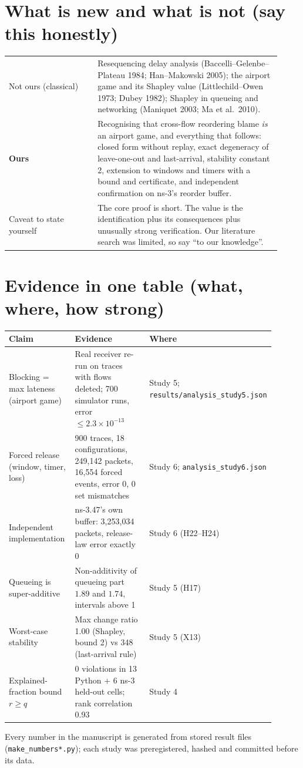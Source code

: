 \documentclass[11pt]{article}
\begin{document}
\section{What is new and what is not (say this honestly)}
\begin{center}
\begin{tabular}{p{0.30\linewidth}p{0.62\linewidth}}
\toprule
Not ours (classical) & Resequencing delay analysis (Baccelli--Gelenbe--Plateau 1984; Han--Makowski 2005); the airport game and its Shapley value (Littlechild--Owen 1973; Dubey 1982); Shapley in queueing and networking (Maniquet 2003; Ma et al.\ 2010).\\
\textbf{Ours} & Recognising that cross-flow reordering blame \emph{is} an airport game, and everything that follows: closed form without replay, exact degeneracy of leave-one-out and last-arrival, stability constant 2, extension to windows and timers with a bound and certificate, and independent confirmation on ns-3's reorder buffer.\\
Caveat to state yourself & The core proof is short. The value is the identification plus its consequences plus unusually strong verification. Our literature search was limited, so say ``to our knowledge''.\\
\bottomrule
\end{tabular}
\end{center}

\section{Evidence in one table (what, where, how strong)}
\begin{center}\small
\begin{tabular}{p{0.26\linewidth}p{0.36\linewidth}p{0.28\linewidth}}
\toprule
Claim & Evidence & Where\\
\midrule
Blocking = max lateness (airport game) & Real receiver re-run on traces with flows deleted; 700 simulator runs, error $\le 2.3\times10^{-13}$ & Study 5; \texttt{results/analysis\_study5.json}\\
Forced release (window, timer, loss) & 900 traces, 18 configurations, 249{,}142 packets, 16{,}554 forced events, error 0, 0 set mismatches & Study 6; \texttt{analysis\_study6.json}\\
Independent implementation & ns-3.47's own buffer: 3{,}253{,}034 packets, release-law error exactly 0 & Study 6 (H22--H24)\\
Queueing is super-additive & Non-additivity of queueing part $1.89$ and $1.74$, intervals above 1 & Study 5 (H17)\\
Worst-case stability & Max change ratio 1.00 (Shapley, bound 2) vs 348 (last-arrival rule) & Study 5 (X13)\\
Explained-fraction bound $r\ge q$ & 0 violations in 13 Python + 6 ns-3 held-out cells; rank correlation 0.93 & Study 4\\
\bottomrule
\end{tabular}
\end{center}
\noindent Every number in the manuscript is generated from stored result files (\texttt{make\_numbers*.py}); each study was preregistered, hashed and committed before its data.
\end{document}
